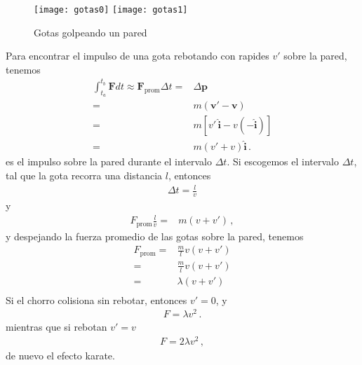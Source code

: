\begin{frame}
 \begin{figure}
  \centering
{\texttt{[image: gotas0]}}
{\texttt{[image: gotas1]}}
  \caption{Gotas golpeando un pared}
  \label{fig:gotas}
\end{figure}
\end{frame}
Para encontrar el impulso de una gota rebotando con rapides $v'$ sobre la pared, tenemos
\begin{align*}
  \int_{t_a}^{t_b} \mathbf{F} dt\approx \mathbf{F}_{\text{prom}}\Delta t=&\Delta \mathbf{p}\nonumber\\
=&m (\mathbf{v}'-\mathbf{v})\nonumber\\
=&m[v'\,\hat{\mathbf{i}}-v(-\hat{\mathbf{i}})]\nonumber\\
=&m(v'+v)\hat{\mathbf{i}}\,.
\end{align*}
es el impulso sobre la pared durante el intervalo $\Delta t$. Si escogemos el intervalo $\Delta t$, tal que la gota recorra una distancia $l$, entonces
\begin{align*}
  \Delta t=\frac{l}{v}
\end{align*}
y
\begin{align*}
  F_{\text{prom}}\frac{l}{v}=&m(v+v')\,,
\end{align*}
y despejando la fuerza promedio de las gotas sobre la pared, tenemos
\begin{align*}
    F_{\text{prom}}=&\frac{m}{l}v(v+v')\nonumber\\
  =&\frac{m}{l}v(v+v')\nonumber\\
  =&\lambda(v+v')\nonumber\\
\end{align*}
Si el chorro colisiona sin rebotar, entonces $v'=0$, y
\begin{align*}
F=\lambda v^2\,.  
\end{align*}
mientras que si rebotan $v'=v$
\begin{align*}
  F=2\lambda v^2\,,
\end{align*}
de nuevo el efecto karate.

